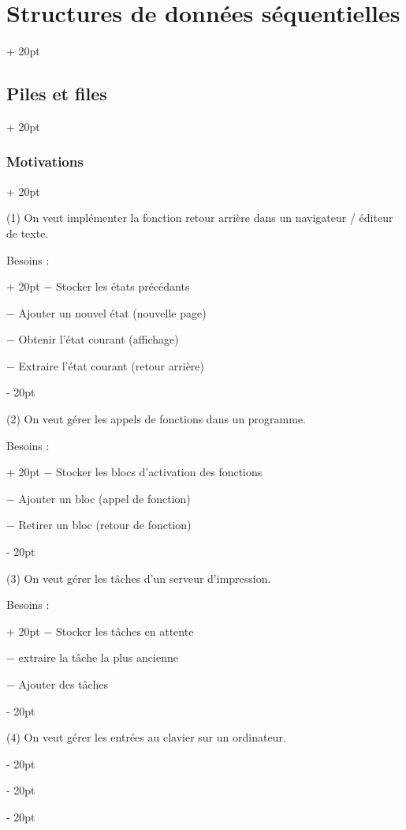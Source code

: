 \documentclass[a4paper, 12pt, twoside]{article}
\newcommand{\ind}[1][20pt]{\advance\leftskip + #1}
\newcommand{\deind}[1][20pt]{\advance\leftskip - #1}
\newenvironment{indt}[2][20pt]{#2 \par \ind[#1]}{\par \deind} %
\begin{document}
\begin{indt}{\section{Structures de données séquentielles}}
\begin{indt}{\subsection{Piles et files}}
\begin{indt}{\subsubsection{Motivations}}
                \vspace{6pt}
                
                (1) On veut implémenter la fonction retour arrière dans un navigateur / éditeur de texte.
                
                \begin{indt}{Besoins :}
                    $-$ Stocker les états précédants
                    
                    $-$ Ajouter un nouvel état (nouvelle page)
                    
                    $-$ Obtenir l'état courant (affichage)
                    
                    $-$ Extraire l'état courant (retour arrière)
                \end{indt}
                
                \vspace{6pt}
                
                (2) On veut gérer les appels de fonctions dans un programme.
                
                \begin{indt}{Besoins :}
                    $-$ Stocker les blocs d'activation des fonctions
                    
                    $-$ Ajouter un bloc (appel de fonction)
                    
                    $-$ Retirer un bloc (retour de fonction)
                \end{indt}
                
                \vspace{6pt}
                
                (3) On veut gérer les tâches d'un serveur d'impression.
                
                \begin{indt}{Besoins :}
                    $-$ Stocker les tâches en attente
                    
                    $-$ extraire la tâche la plus ancienne
                    
                    $-$ Ajouter des tâches
                \end{indt}
                
                \vspace{6pt}
                
                (4) On veut gérer les entrées au clavier sur un ordinateur.
                

\end{indt}
\end{indt}
\end{indt}
\end{document}
